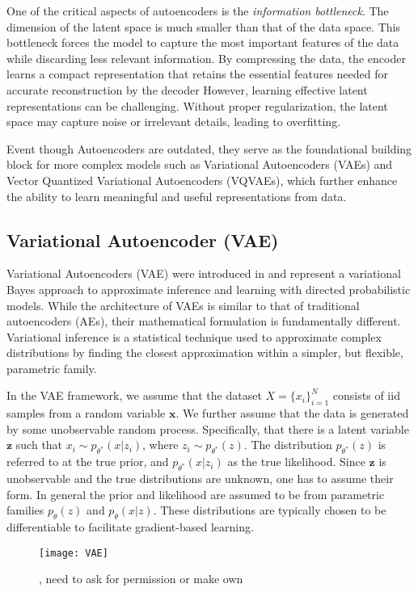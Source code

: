 \documentclass[../../thesis.tex]{subfiles}
\begin{document}
One of the critical aspects of autoencoders is the \textit{information bottleneck}. The dimension of the latent space is much smaller than that of the data space. This bottleneck forces the model to capture the most important features of the data while discarding less relevant information. By compressing the data, the encoder learns a compact representation that retains the essential features needed for accurate reconstruction by the decoder However, learning effective latent representations can be challenging. Without proper regularization, the latent space may capture noise or irrelevant details, leading to overfitting.\newline

Event though Autoencoders are outdated, they serve as the foundational building block for more complex models such as Variational Autoencoders (VAEs) and Vector Quantized Variational Autoencoders (VQVAEs), which further enhance the ability to learn meaningful and useful representations from data.

\subsection{Variational Autoencoder (VAE)}
Variational Autoencoders (VAE) were introduced in \cite{kingma2022autoencoding} and represent a variational Bayes approach to approximate inference and learning with directed probabilistic models. While the architecture of VAEs is similar to that of traditional autoencoders (AEs), their mathematical formulation is fundamentally different. Variational inference is a statistical technique used to approximate complex distributions by finding the closest approximation within a simpler, but flexible, parametric family. \newline 

In the VAE framework, we assume that the dataset $X = \{x_i\}_{i=1}^{N}$ consists of iid samples from a random variable $\mathbf{x}$. We further assume that the data is generated by some unobservable random process. Specifically, that there is a latent variable $\mathbf{z}$ such that $x_i \sim p_{\theta^*}(x|z_i)$, where $z_i \sim p_{\theta^*}(z)$. The distribution $p_{\theta^*}(z)$ is referred to at the true prior, and $p_{\theta^*}(x|z_i)$ as the true likelihood. Since $\mathbf{z}$ is unobservable and the true distributions are unknown, one has to assume their form. In general the prior and likelihood are assumed to be from parametric families $p_{\theta}(z)$ and $p_{\theta}(x|z)$. These distributions are typically chosen to be differentiable to facilitate gradient-based learning.\newline
\begin{figure}[h]
    \texttt{[image: VAE]}
    \centering  
    \caption{\cite{VAE}, need to ask for permission or make own}  
\end{figure}
\end{document}
